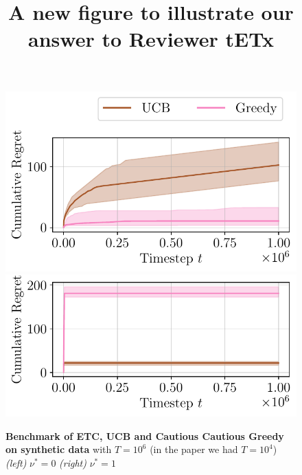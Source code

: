 \documentclass{article}
\title{A new figure to illustrate our answer to Reviewer tETx}
\author{}
\date{}
\theoremstyle{plain}
\theoremstyle{definition}
\theoremstyle{remark}
\begin{document}
\maketitle

\begin{figure}[h]
    \centering
    \includegraphics[width=.4\textwidth]{no_eliminationT1e6.pdf}
    \includegraphics[width=.4\textwidth]{0_playersT1e6.pdf}
    \caption{\textbf{Benchmark of ETC, UCB and Cautious Cautious Greedy on synthetic data} with $T=10^6$ (in the paper we had $T=10^4$) \textit{(left)} $\nu^* = 0$ \textit{(right)} $\nu^* = 1$ }
    \vspace{-1em}
    \label{fig:all}
  \end{figure}
\end{document}
